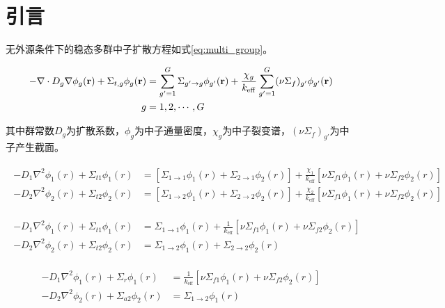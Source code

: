 \section{引言}

无外源条件下的稳态多群中子扩散方程如式\ref{eq:multi_group}。

\begin{align}
    \label{eq:multi_group}
    \begin{split}
        -\nabla\cdot D_g\nabla\phi_g(\vectorbold{r}) + \Sigma_{t,g}\phi_g(\vectorbold{r}) &= \sum_{g'=1}^G\Sigma_{g'\rightarrow g}\phi_{g'}(\vectorbold{r}) + \frac{\chi_g}{k_\mathrm{eff}}\sum_{g'=1}^G(\nu\Sigma_f)_{g'}\phi_{g'}(\vectorbold{r}) \\
        g &= 1,2,\cdots,G
    \end{split}
\end{align}

其中群常数$D_g$为扩散系数，$\phi_g$为中子通量密度，$\chi_g$为中子裂变谱，$(\nu\Sigma_f)_{g'}$为中子产生截面。

\begin{align}
    \label{eq:two_group}
    \begin{split}
        -D_1\nabla^2\phi_1(r) + \Sigma_{t1}\phi_1(r) &= \left[\Sigma_{1\rightarrow 1}\phi_1(r) + \Sigma_{2\rightarrow 1}\phi_2(r)\right] + \frac{\chi_1}{k_\mathrm{eff}}\left[\nu\Sigma_{f1}\phi_1(r)+\nu\Sigma_{f2}\phi_2(r)\right] \\
        -D_2\nabla^2\phi_2(r) + \Sigma_{t2}\phi_2(r) &= \left[\Sigma_{1\rightarrow 2}\phi_1(r) + \Sigma_{2\rightarrow 2}\phi_2(r)\right] + \frac{\chi_2}{k_\mathrm{eff}}\left[\nu\Sigma_{f1}\phi_1(r)+\nu\Sigma_{f2}\phi_2(r)\right]
    \end{split}
\end{align}

\begin{align}
    \label{eq:two2_group}
    \begin{split}
        -D_1\nabla^2\phi_1(r) + \Sigma_{t1}\phi_1(r) &= \Sigma_{1\rightarrow 1}\phi_1(r) + \frac{1}{k_\mathrm{eff}}\left[\nu\Sigma_{f1}\phi_1(r)+\nu\Sigma_{f2}\phi_2(r)\right] \\
        -D_2\nabla^2\phi_2(r) + \Sigma_{t2}\phi_2(r) &= \Sigma_{1\rightarrow 2}\phi_1(r) + \Sigma_{2\rightarrow 2}\phi_2(r)
    \end{split}
\end{align}

\begin{align}
    \label{eq:two3_group}
    \begin{split}
        -D_1\nabla^2\phi_1(r) + \Sigma_r\phi_1(r) &= \frac{1}{k_\mathrm{eff}}\left[\nu\Sigma_{f1}\phi_1(r)+\nu\Sigma_{f2}\phi_2(r)\right] \\
        -D_2\nabla^2\phi_2(r) + \Sigma_{a2}\phi_2(r) &= \Sigma_{1\rightarrow 2}\phi_1(r)
    \end{split}
\end{align}

